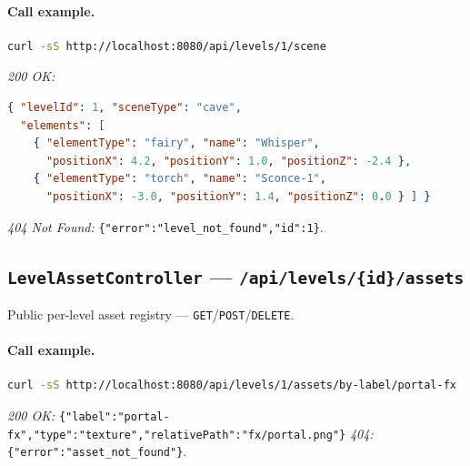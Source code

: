 \paragraph{Call example.}
\begin{lstlisting}[language=bash]
curl -sS http://localhost:8080/api/levels/1/scene
\end{lstlisting}
\textit{200 OK:}
\begin{lstlisting}[language=json]
{ "levelId": 1, "sceneType": "cave",
  "elements": [
    { "elementType": "fairy", "name": "Whisper",
      "positionX": 4.2, "positionY": 1.0, "positionZ": -2.4 },
    { "elementType": "torch", "name": "Sconce-1",
      "positionX": -3.0, "positionY": 1.4, "positionZ": 0.0 } ] }
\end{lstlisting}
\textit{404 Not Found:} \texttt{\{"error":"level\_not\_found","id":1\}}.

\subsection{\texttt{LevelAssetController} — \texttt{/api/levels/\{id\}/assets}}
Public per-level asset registry — \texttt{GET}/\texttt{POST}/\texttt{DELETE}.


\paragraph{Call example.}
\begin{lstlisting}[language=bash]
curl -sS http://localhost:8080/api/levels/1/assets/by-label/portal-fx
\end{lstlisting}
\textit{200 OK:} \texttt{\{"label":"portal-fx","type":"texture","relativePath":"fx/portal.png"\}} {\rm{}}\textit{404:} \texttt{\{"error":"asset\_not\_found"\}}.

